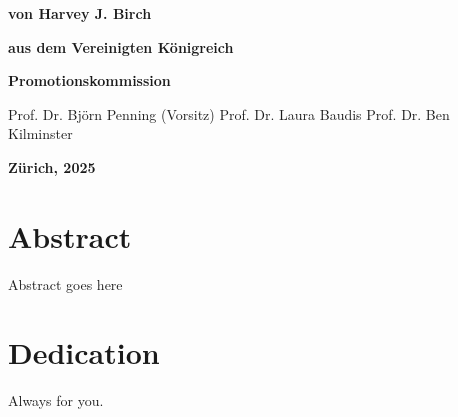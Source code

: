 \documentclass[a4paper,11pt,usegeometry]{scrreprt} %
\begin{document}
\begin{titlepage}
\begin{center}
\bfseries %
von%
\break
\break
\mdseries %
Harvey J. Birch%
\break

\bfseries %
aus%
\break
\break
\mdseries %
dem Vereinigten K\"onigreich%
\break
\break
\break
\break

\bfseries %
Promotionskommission%
\vspace{3pt}%
\break
\break
\hspace*{11.5mm}%
\begin{minipage}{7cm}
\flushleft %
\mdseries %
Prof. Dr. Bj\"orn Penning (Vorsitz) %
\break
\break
Prof. Dr.  Laura Baudis%
\break
\break
Prof. Dr. Ben Kilminster%
\end{minipage}
\break
\break
\break
\break
\break
\break

\bfseries%
Z\"urich, 2025%

\end{center}
\end{titlepage}
\restoregeometry

\newpage
\thispagestyle{empty}
\newpage
 
\chapter*{Abstract}
Abstract goes here

\chapter*{Dedication}
\centering
Always for you.
\end{document}
